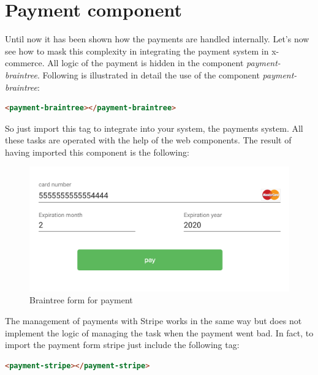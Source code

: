 \section{Payment component}
\label{sec:payment_component}
Until now it has been shown how the payments are handled internally. Let's now see how to mask this complexity in integrating the payment system in x-commerce.
\newline
All logic of the payment is hidden in the component \emph{payment-braintree}.
\newline
Following is illustrated in detail the use of the component \emph{payment-braintree}:
\begin{lstlisting}[language=html]
<payment-braintree></payment-braintree>
\end{lstlisting}
So just import this tag to integrate into your system, the payments system. All these tasks are operated with the help of the web components.
\newline
The result of having imported this component is the following:
\begin{figure}[htb]
 \centering
 \includegraphics[width=0.8\linewidth]{images/chapter5/braintree1.png}\hfill
 \caption[Braintree form]{Braintree form for payment}
 \label{fig:brintree_form1}
\end{figure}
The management of payments with Stripe works in the same way but does not implement the logic of managing the task when the payment went bad. In fact, to import the payment form stripe just include the following tag:
\begin{lstlisting}[language=html]
<payment-stripe></payment-stripe>
\end{lstlisting}